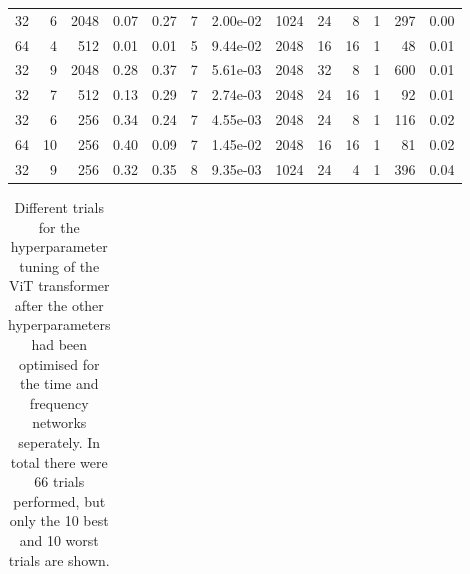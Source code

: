 \begin{appendices}
\begin{table}
\begin{tabular}{rrrrrrrrrrrrr}
32 & 6 & 2048 & 0.07 & 0.27 & 7 & 2.00e-02 & 1024 & 24 & 8 & 1 & 297 & 0.00 \\
64 & 4 & 512 & 0.01 & 0.01 & 5 & 9.44e-02 & 2048 & 16 & 16 & 1 & 48 & 0.01 \\
32 & 9 & 2048 & 0.28 & 0.37 & 7 & 5.61e-03 & 2048 & 32 & 8 & 1 & 600 & 0.01 \\
32 & 7 & 512 & 0.13 & 0.29 & 7 & 2.74e-03 & 2048 & 24 & 16 & 1 & 92 & 0.01 \\
32 & 6 & 256 & 0.34 & 0.24 & 7 & 4.55e-03 & 2048 & 24 & 8 & 1 & 116 & 0.02 \\
64 & 10 & 256 & 0.40 & 0.09 & 7 & 1.45e-02 & 2048 & 16 & 16 & 1 & 81 & 0.02 \\
32 & 9 & 256 & 0.32 & 0.35 & 8 & 9.35e-03 & 1024 & 24 & 4 & 1 & 396 & 0.04 \\
\bottomrule
\end{tabular}
\end{table}

\begin{table}
\caption{Different trials for the hyperparameter tuning of the ViT transformer after the other hyperparameters had been optimised for the time and frequency networks seperately. In total there were 66 trials performed, but only the 10 best and 10 worst trials are shown.}
\label{tab:hyperparams_vit_combined}
\begin{tabular}{rrrrrrrr}
\toprule


\end{tabular}
\end{table}
\end{appendices}
